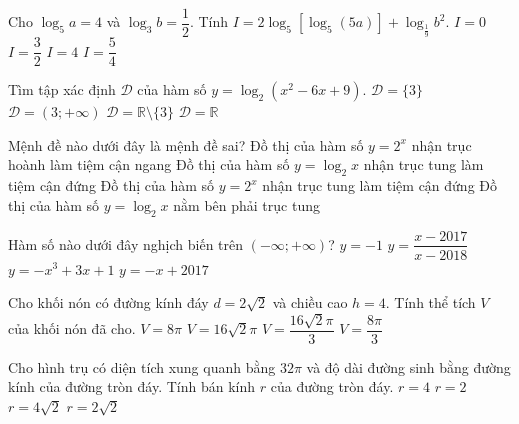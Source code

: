 \begin{ex}%
Cho $\log_5a=4$ và $\log_3b=\dfrac{1}{2}$. Tính $I=2\log_5[\log_5(5a)]+\log_{\frac{1}{9}}b^2$. 
\choice
{$I=0$}
{\True $I=\dfrac{3}{2}$}
{$I=4$}
{$I=\dfrac{5}{4}$}
\end{ex}
\begin{ex}%
Tìm tập xác định $\mathscr{D}$ của hàm số $y=\log_2(x^2-6x+9)$. 
\choice
{$\mathscr{D}=\{3\}$}
{$\mathscr{D}=(3;+\infty)$}
{\True $\mathscr{D}=\mathbb{R}\setminus\{3\}$}
{$\mathscr{D}=\mathbb{R}$}	
\end{ex}
\begin{ex}%
Mệnh đề nào dưới đây là mệnh đề sai?
\choice
{Đồ thị của hàm số $y=2^x$ nhận trục hoành làm tiệm cận ngang}
{Đồ thị của hàm số $y=\log_2x$ nhận trục tung làm tiệm cận đứng}
{\True Đồ thị của hàm số $y=2^x$ nhận trục tung làm tiệm cận đứng}
{Đồ thị của hàm số $y=\log_2x$ nằm bên phải trục tung}
\end{ex}
\begin{ex}%
Hàm số nào dưới đây nghịch biến trên $(-\infty;+\infty)$?
\choice
{$y=-1$}
{$y=\dfrac{x-2017}{x-2018}$}
{$y=-x^3+3x+1$}
{\True $y=-x+2017$}
\end{ex}
\begin{ex}%
Cho khối nón có đường kính đáy $d=2\sqrt{2}$ và chiều cao $h=4$. Tính thể tích $V$ của khối nón đã cho. 
\choice
{$V=8\pi$}
{$V=16\sqrt{2}\pi$}
{$V=\dfrac{16\sqrt{2}\pi}{3}$}
{\True $V=\dfrac{8\pi}{3}$}
\end{ex}
\begin{ex}%
Cho hình trụ có diện tích xung quanh bằng $32\pi$ và độ dài đường sinh bằng đường kính của đường tròn đáy. Tính bán kính $r$ của đường tròn đáy. 
\choice
{$r=4$}
{$r=2$}
{$r=4\sqrt{2}$}
{\True $r=2\sqrt{2}$}	
\end{ex}
